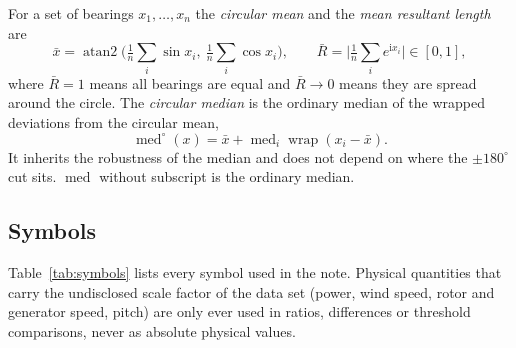 \documentclass[11pt,a4paper]{article}
\theoremstyle{remark}
\newcommand{\wrap}{\operatorname{wrap}}
\newcommand{\med}{\operatorname{med}}
\newcommand{\cmed}{\operatorname{med}^{\circ}}
\newcommand{\dg}{^{\circ}}
\begin{document}
For a set of bearings $x_1,\dots,x_n$ the \emph{circular mean} and the
\emph{mean resultant length} are
\begin{equation}
  \bar x = \operatorname{atan2}\Big(\tfrac1n\sum_i \sin x_i,\ \tfrac1n\sum_i \cos x_i\Big),
  \qquad
  \bar R = \Big|\tfrac1n\sum_i e^{\mathrm{i}x_i}\Big| \in [0,1],
  \label{eq:circmean}
\end{equation}
where $\bar R = 1$ means all bearings are equal and $\bar R\to0$ means they are
spread around the circle. The \emph{circular median} is the ordinary median of the
wrapped deviations from the circular mean,
\begin{equation}
  \cmed(x) = \bar x + \med_i \wrap(x_i - \bar x) .
  \label{eq:circmed}
\end{equation}
It inherits the robustness of the median and does not depend on where the
$\pm180\dg$ cut sits. $\med$ without subscript is the ordinary median.

\subsection{Symbols}
Table~\ref{tab:symbols} lists every symbol used in the note. Physical quantities
that carry the undisclosed scale factor of the data set (power, wind speed,
rotor and generator speed, pitch) are only ever used in ratios, differences or
threshold comparisons, never as absolute physical values.
\end{document}
